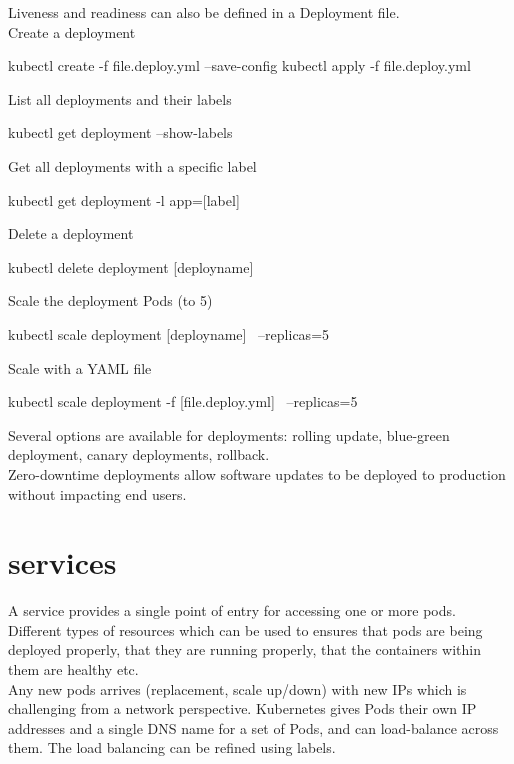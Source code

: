 \documentclass{refcard}
\begin{document}
Liveness and readiness can also be defined in a Deployment file.\\

Create a deployment
\begin{ttyenv}
kubectl create -f file.deploy.yml --save-config
kubectl apply -f file.deploy.yml
\end{ttyenv}

List all deployments and their labels
\begin{ttyenv}
kubectl get deployment --show-labels
\end{ttyenv}

Get all deployments with a specific label
\begin{ttyenv}
kubectl get deployment -l app=[label]
\end{ttyenv}

Delete a deployment
\begin{ttyenv}
kubectl delete deployment [deployname]
\end{ttyenv}

Scale the deployment Pods (to 5)
\begin{ttyenv}
kubectl scale deployment [deployname] \
    --replicas=5
\end{ttyenv}

Scale with a YAML file
\begin{ttyenv}
kubectl scale deployment -f [file.deploy.yml] \
    --replicas=5
\end{ttyenv}

Several options are available for deployments: rolling update, blue-green deployment, canary deployments, rollback.\\

Zero-downtime deployments allow software updates to be deployed to production without impacting end users.\\

\section{services}

A service provides a single point of entry for accessing one or more pods. Different types of resources which can be used to ensures that pods are being deployed properly, that they are running properly, that the containers within them are healthy etc.\\

Any new pods arrives (replacement, scale up/down) with new IPs which is challenging from a network perspective. Kubernetes gives Pods their own IP addresses and a single DNS name for a set of Pods, and can load-balance across them. The load balancing can be refined using labels.\\
\end{document}
